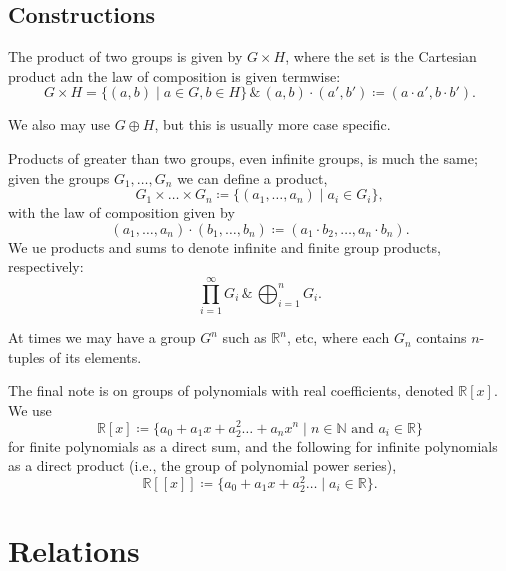 \documentclass[12pt,oneside]{report}
\begin{document}
\subsection{Constructions}

\begin{definition}
  The product of two groups is given by \( G\times H \), where the set is the Cartesian product adn the law of composition is given termwise:
  \begin{displaymath}
    G\times H = \{(a,b)\mid a \in G,b\in H\} \, \& \, (a,b)\cdot (a',b')\coloneqq (a\cdot a',b\cdot b').
  \end{displaymath}
  
\end{definition}
We also may use \( G\oplus H \), but this is usually more case specific. 

Products of greater than two groups, even infinite groups, is much the same; given the groups \(G_{1},\ldots ,G_n\) we can define a product, \[ G_{1}\times \ldots \times G_n \coloneqq  \{ (a_{1},\ldots ,a_n) \mid  a_i \in  G_i \},\] with the law of composition given by \[ (a_{1},\ldots ,a_n)\cdot (b_{1},\ldots ,b_n)\coloneqq (a_{1}\cdot b_{2},\ldots ,a_n \cdot b_n).\] 
We ue products and sums to denote infinite and finite group products, respectively:\[
  \prod^{\infty}_{i=1} G_i \, \& \, \bigoplus_{i=1}^n G_i
.\] 

At times we may have a group \( G^n \) such as \( \mathbb{R}^n \), etc, where each \( G_n \) contains \( n \)-tuples of its elements. 

The final note is on groups of polynomials with real coefficients, denoted \( \mathbb{R}[x] \). We use \[
  \mathbb{R}[x] \coloneqq \{ a_{0}+a_{1}x+a_{2}^2\ldots +a_nx^n \mid  n \in  \mathbb{N} \text{ and } a_i \in  \mathbb{R} \}\]  for finite polynomials as a direct sum, and the following for infinite polynomials as a direct product (i.e., the group of polynomial power series), \[
  \mathbb{R}[[x]] \coloneqq \{ a_{0}+a_{1}x+a_{2}^2\ldots \mid a_i \in  \mathbb{R} \}
  .\]



\section{Relations}

\end{document}
